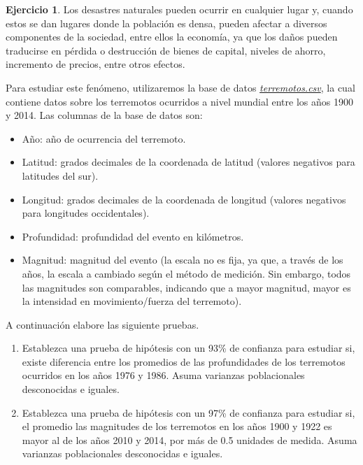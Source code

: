 \documentclass[
  11pt,
]{book}
\providecommand{\tightlist}{%
  \setlength{\itemsep}{0pt}\setlength{\parskip}{0pt}}
\theoremstyle{definition}
\theoremstyle{definition}
\theoremstyle{definition}
\newtheorem{exercise}{Ejercicio}[chapter]
\theoremstyle{definition}
\theoremstyle{remark}
\begin{document}
\begin{exercise}

Los desastres naturales pueden ocurrir en cualquier lugar y, cuando estos se dan lugares donde la población es densa, pueden afectar a diversos componentes de la sociedad, entre ellos la economía, ya que los daños pueden traducirse en pérdida o destrucción de bienes de capital, niveles de ahorro, incremento de precios, entre otros efectos.

Para estudiar este fenómeno, utilizaremos la base de datos \href{https://raw.githubusercontent.com/Dfranzani/Bases-de-datos-para-cursos/main/2022-2/Estad\%C3\%ADstica\%202/terremotos.csv}{\emph{terremotos.csv}}, la cual contiene datos sobre los terremotos ocurridos a nivel mundial entre los años 1900 y 2014. Las columnas de la base de datos son:

\begin{itemize}
\tightlist
\item
  Año: año de ocurrencia del terremoto.
\item
  Latitud: grados decimales de la coordenada de latitud (valores negativos para latitudes del sur).
\item
  Longitud: grados decimales de la coordenada de longitud (valores negativos para longitudes occidentales).
\item
  Profundidad: profundidad del evento en kilómetros.
\item
  Magnitud: magnitud del evento (la escala no es fija, ya que, a través de los años, la escala a cambiado según el método de medición. Sin embargo, todos las magnitudes son comparables, indicando que a mayor magnitud, mayor es la intensidad en movimiento/fuerza del terremoto).
\end{itemize}

A continuación elabore las siguiente pruebas.

\begin{enumerate}
\def\labelenumi{\arabic{enumi}.}
\item
  Establezca una prueba de hipótesis con un 93\% de confianza para estudiar si, existe diferencia entre los promedios de las profundidades de los terremotos ocurridos en los años 1976 y 1986. Asuma varianzas poblacionales desconocidas e iguales.
\item
  Establezca una prueba de hipótesis con un 97\% de confianza para estudiar si, el promedio las magnitudes de los terremotos en los años 1900 y 1922 es mayor al de los años 2010 y 2014, por más de 0.5 unidades de medida. Asuma varianzas poblacionales desconocidas e iguales.
\end{enumerate}

\end{exercise}
\end{document}
